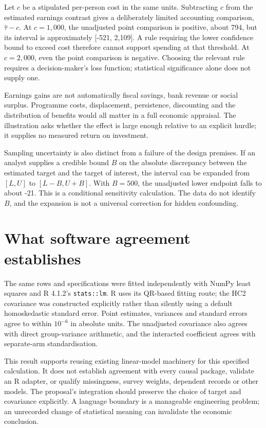 Let $c$ be a stipulated per-person cost in the same units. Subtracting $c$
from the estimated earnings contrast gives a deliberately limited accounting
comparison, $\widehat\tau-c$. At $c=1,000$, the unadjusted point comparison
is positive, about 794, but its interval is approximately [-521, 2,109].
A rule requiring the lower confidence bound to exceed cost therefore cannot
support spending at that threshold. At $c=2,000$, even the point comparison
is negative. Choosing the relevant rule requires a decision-maker's loss
function; statistical significance alone does not supply one.

Earnings gains are not automatically fiscal savings, bank revenue or social
surplus. Programme costs, displacement, persistence, discounting and the
distribution of benefits would all matter in a full economic appraisal.
The illustration asks whether the effect is large enough relative to an
explicit hurdle; it supplies no measured return on investment.

Sampling uncertainty is also distinct from a failure of the design premises.
If an analyst supplies a credible bound $B$ on the absolute discrepancy
between the estimated target and the target of interest, the interval can be
expanded from $[L,U]$ to $[L-B,U+B]$. With $B=500$, the unadjusted lower
endpoint falls to about -21. This is a conditional sensitivity calculation.
The data do not identify $B$, and the expansion is not a universal correction
for hidden confounding.

\section{What software agreement establishes}
The same rows and specifications were fitted independently with NumPy least
squares and R 4.1.2's \texttt{stats::lm}. R uses its QR-based fitting route;
the HC2 covariance was constructed explicitly rather than silently using a
default homoskedastic standard error. Point estimates, variances and standard
errors agree to within $10^{-6}$ in absolute units. The unadjusted covariance
also agrees with direct group-variance arithmetic, and the interacted
coefficient agrees with separate-arm standardisation. \citep{gap29r}

This result supports reusing existing linear-model machinery for this
specified calculation. It does not establish agreement with every causal
package, validate an R adapter, or qualify missingness, survey weights,
dependent records or other models. The proposal's integration should preserve
the choice of target and covariance explicitly. A language boundary is a
manageable engineering problem; an unrecorded change of statistical meaning
can invalidate the economic conclusion.

